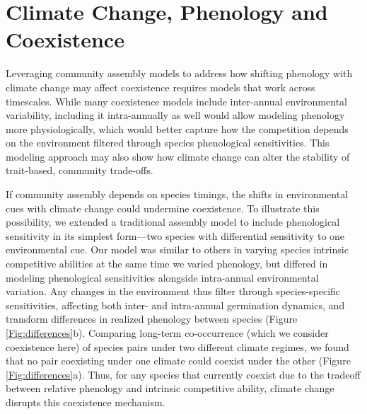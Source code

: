 \documentclass{article}[12pt]
\begin{document}


\section{Climate Change, Phenology and Coexistence}
Leveraging community assembly models to address how shifting phenology with climate change may affect coexistence requires models that work across timescales. While many coexistence models include inter-annual environmental variability, including it intra-annually as well would allow modeling phenology more physiologically, which would better capture how the competition depends on the environment filtered through species phenological sensitivities. This modeling approach may also show how climate change can alter the stability of trait-based, community trade-offs. 

If community assembly depends on species timings, the shifts in environmental cues with climate change could undermine coexistence. 
To illustrate this possibility, we extended a traditional assembly model to include phenological sensitivity in its simplest form---two species with differential sensitivity to one environmental cue. Our model was similar to others in varying species intrinsic competitive abilities at the same time we varied phenology, but differed in modeling phenological sensitivities alongside intra-annual environmental variation.
Any changes in the environment thus filter through species-specific sensitivities, affecting both inter- and intra-annual germination dynamics, and transform differences in realized phenology between species (Figure \ref{Fig:differences}b). 
Comparing long-term co-occurrence (which we consider coexistence here) of species pairs under two different climate regimes, we found that no pair coexisting under one climate could coexist under the other (Figure \ref{Fig:differences}a). Thus, for any species that currently coexist due to the tradeoff between relative phenology and intrinsic competitive ability, climate change disrupts this coexistence mechanism. 
\end{document}
